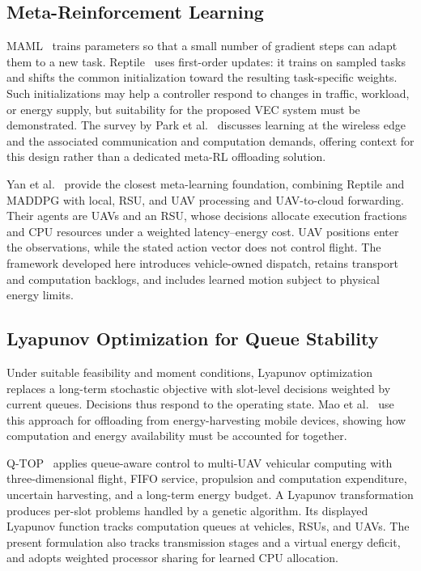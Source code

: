 \documentclass[journal]{IEEEtran}
\begin{document}
\subsection{Meta-Reinforcement Learning}
MAML~\cite{finn2017model} trains parameters so that a small number of gradient steps can adapt them to a new task. Reptile~\cite{nichol2018reptile} uses first-order updates: it trains on sampled tasks and shifts the common initialization toward the resulting task-specific weights. Such initializations may help a controller respond to changes in traffic, workload, or energy supply, but suitability for the proposed VEC system must be demonstrated. The survey by Park et al.\ \cite{park2019meta} discusses learning at the wireless edge and the associated communication and computation demands, offering context for this design rather than a dedicated meta-RL offloading solution.

Yan et al.\ \cite{yan2026rmaddpg} provide the closest meta-learning foundation, combining Reptile and MADDPG with local, RSU, and UAV processing and UAV-to-cloud forwarding. Their agents are UAVs and an RSU, whose decisions allocate execution fractions and CPU resources under a weighted latency--energy cost. UAV positions enter the observations, while the stated action vector does not control flight. The framework developed here introduces vehicle-owned dispatch, retains transport and computation backlogs, and includes learned motion subject to physical energy limits.

\subsection{Lyapunov Optimization for Queue Stability}
Under suitable feasibility and moment conditions, Lyapunov optimization~\cite{neely2010stochastic} replaces a long-term stochastic objective with slot-level decisions weighted by current queues. Decisions thus respond to the operating state. Mao et al.\ \cite{mao2017dynamic} use this approach for offloading from energy-harvesting mobile devices, showing how computation and energy availability must be accounted for together.

Q-TOP~\cite{sun2026qtop} applies queue-aware control to multi-UAV vehicular computing with three-dimensional flight, FIFO service, propulsion and computation expenditure, uncertain harvesting, and a long-term energy budget. A Lyapunov transformation produces per-slot problems handled by a genetic algorithm. Its displayed Lyapunov function tracks computation queues at vehicles, RSUs, and UAVs. The present formulation also tracks transmission stages and a virtual energy deficit, and adopts weighted processor sharing for learned CPU allocation.
\end{document}
